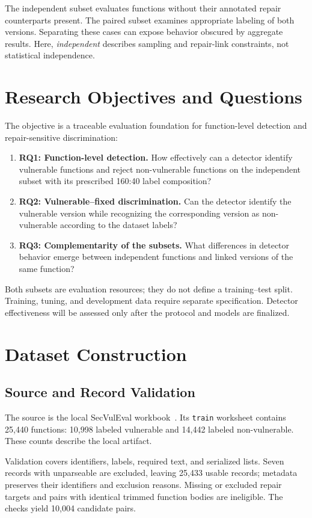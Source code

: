 \documentclass[conference]{IEEEtran}
\begin{document}
The independent subset evaluates functions without their annotated repair counterparts present. The paired subset examines appropriate labeling of both versions. Separating these cases can expose behavior obscured by aggregate results. Here, \emph{independent} describes sampling and repair-link constraints, not statistical independence.

\section{Research Objectives and Questions}
The objective is a traceable evaluation foundation for function-level detection and repair-sensitive discrimination:

\begin{enumerate}
    \item \textbf{RQ1: Function-level detection.} How effectively can a detector identify vulnerable functions and reject non-vulnerable functions on the independent subset with its prescribed 160:40 label composition?
    \item \textbf{RQ2: Vulnerable--fixed discrimination.} Can the detector identify the vulnerable version while recognizing the corresponding version as non-vulnerable according to the dataset labels?
    \item \textbf{RQ3: Complementarity of the subsets.} What differences in detector behavior emerge between independent functions and linked versions of the same function?
\end{enumerate}

Both subsets are evaluation resources; they do not define a training--test split. Training, tuning, and development data require separate specification. Detector effectiveness will be assessed only after the protocol and models are finalized.

\section{Dataset Construction}
\subsection{Source and Record Validation}
The source is the local SecVulEval workbook~\cite{ahmed2026secvuleval,secvulevaldata}. Its \texttt{train} worksheet contains 25,440 functions: 10,998 labeled vulnerable and 14,442 labeled non-vulnerable. These counts describe the local artifact.

Validation covers identifiers, labels, required text, and serialized lists. Seven records with unparseable  are excluded, leaving 25,433 usable records; metadata preserves their identifiers and exclusion reasons. Missing or excluded repair targets and pairs with identical trimmed function bodies are ineligible. The checks yield 10,004 candidate pairs.
\end{document}
